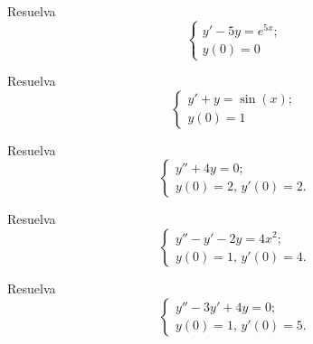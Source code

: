 \begin{problema}
  \label{bron:exmp:24.2}
  Resuelva
  $$\begin{cases}
     y'-5y=e^{5x};\\
     y(0)=0
    \end{cases}
$$
 \end{problema}




 \begin{problema}
  \label{bron:exmp:24.3}
  Resuelva
  $$\begin{cases}
     y'+y=\sin(x);\\
     y(0)=1
    \end{cases}
$$
 \end{problema}




 \begin{problema}
  \label{bron:exmp:24.4}
  Resuelva
  $$\begin{cases}
     y''+4y=0;\\
     y(0)=2, \, y'(0)=2.
    \end{cases}
$$
 \end{problema}




 \begin{problema}
  \label{bron:exmp:24.6}
  Resuelva
  $$\begin{cases}
     y''-y'-2y=4x^{2};\\
     y(0)=1, \, y'(0)=4.
    \end{cases}
$$
 \end{problema}




 \begin{problema}
  \label{bron:exmp:24.5}
  Resuelva
  $$\begin{cases}
     y''-3y'+4y=0;\\
     y(0)=1, \, y'(0)=5.
    \end{cases}
$$
 \end{problema}



